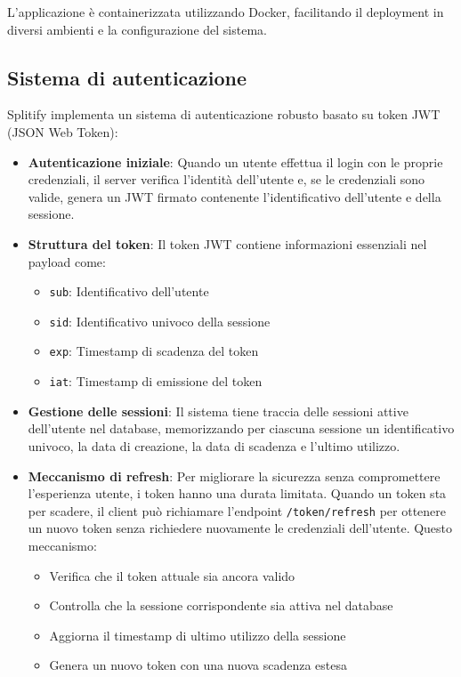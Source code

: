 \documentclass[11pt]{article}
\begin{document}
L'applicazione è containerizzata utilizzando Docker, facilitando il deployment in diversi ambienti e la configurazione del sistema.

\subsection{Sistema di autenticazione}
Splitify implementa un sistema di autenticazione robusto basato su token JWT (JSON Web Token):

\begin{itemize}
    \item \textbf{Autenticazione iniziale}: Quando un utente effettua il login con le proprie credenziali, il server verifica l'identità dell'utente e, se le credenziali sono valide, genera un JWT firmato contenente l'identificativo dell'utente e della sessione.

    \item \textbf{Struttura del token}: Il token JWT contiene informazioni essenziali nel payload come:
    \begin{itemize}
        \item \texttt{sub}: Identificativo dell'utente
        \item \texttt{sid}: Identificativo univoco della sessione
        \item \texttt{exp}: Timestamp di scadenza del token
        \item \texttt{iat}: Timestamp di emissione del token
    \end{itemize}

    \item \textbf{Gestione delle sessioni}: Il sistema tiene traccia delle sessioni attive dell'utente nel database, memorizzando per ciascuna sessione un identificativo univoco, la data di creazione, la data di scadenza e l'ultimo utilizzo.

    \item \textbf{Meccanismo di refresh}: Per migliorare la sicurezza senza compromettere l'esperienza utente, i token hanno una durata limitata. Quando un token sta per scadere, il client può richiamare l'endpoint \texttt{/token/refresh} per ottenere un nuovo token senza richiedere nuovamente le credenziali dell'utente. Questo meccanismo:
    \begin{itemize}
        \item Verifica che il token attuale sia ancora valido
        \item Controlla che la sessione corrispondente sia attiva nel database
        \item Aggiorna il timestamp di ultimo utilizzo della sessione
        \item Genera un nuovo token con una nuova scadenza estesa
    \end{itemize}


\end{itemize}
\end{document}
